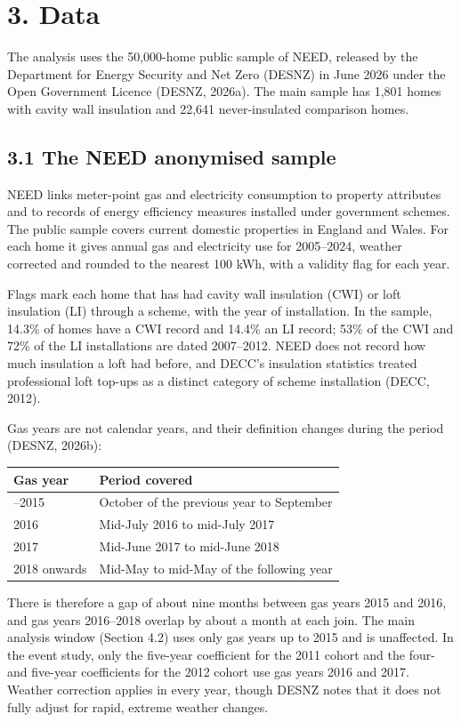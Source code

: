 \documentclass[11pt,a4paper]{article}
\begin{document}
\section*{3. Data}

The analysis uses the 50,000-home public sample of NEED, released by the Department for Energy Security and Net Zero (DESNZ) in June 2026 under the Open Government Licence (DESNZ, 2026a). The main sample has 1,801 homes with cavity wall insulation and 22,641 never-insulated comparison homes.

\subsection*{3.1 The NEED anonymised sample}

NEED links meter-point gas and electricity consumption to property attributes and to records of energy efficiency measures installed under government schemes. The public sample covers current domestic properties in England and Wales. For each home it gives annual gas and electricity use for 2005--2024, weather corrected and rounded to the nearest 100 kWh, with a validity flag for each year.

Flags mark each home that has had cavity wall insulation (CWI) or loft insulation (LI) through a scheme, with the year of installation. In the sample, 14.3\% of homes have a CWI record and 14.4\% an LI record; 53\% of the CWI and 72\% of the LI installations are dated 2007--2012. NEED does not record how much insulation a loft had before, and DECC's insulation statistics treated professional loft top-ups as a distinct category of scheme installation (DECC, 2012).

Gas years are not calendar years, and their definition changes during the period (DESNZ, 2026b):

{\small
\begin{longtable}[]{@{}ll@{}}
\toprule\noalign{}
Gas year & Period covered \\
\midrule\noalign{}
\endhead
\bottomrule\noalign{}
\endlastfoot
2005--2015 & October of the previous year to September \\
2016 & Mid-July 2016 to mid-July 2017 \\
2017 & Mid-June 2017 to mid-June 2018 \\
2018 onwards & Mid-May to mid-May of the following year \\
\end{longtable}
}

There is therefore a gap of about nine months between gas years 2015 and 2016, and gas years 2016--2018 overlap by about a month at each join. The main analysis window (Section 4.2) uses only gas years up to 2015 and is unaffected. In the event study, only the five-year coefficient for the 2011 cohort and the four- and five-year coefficients for the 2012 cohort use gas years 2016 and 2017. Weather correction applies in every year, though DESNZ notes that it does not fully adjust for rapid, extreme weather changes.
\end{document}
